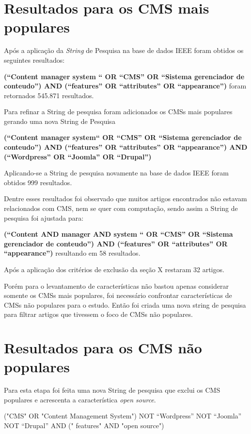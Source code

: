 \begin{apendicesenv}
\section{Resultados para os CMS mais populares}
 
Após a aplicação da \textit{String} de Pesquisa na base de dados IEEE foram obtidos os seguintes resultados:

\textbf{(“Content manager system “ OR “CMS” OR “Sistema gerenciador de conteudo”) AND (“features” OR “attributes” OR “appearance”)} foram retornados 545.871 resultados.

Para refinar a String de pesquisa foram adicionados os CMSs mais populares gerando uma nova String de Pesquisa

\textbf{(“Content manager system“ OR “CMS” OR “Sistema gerenciador de conteudo”) AND (“features” OR “attributes” OR “appearance”) AND (“Wordpress”  OR  “Joomla” OR “Drupal”)}

Aplicando-se a String de pesquisa novamente na base de dados IEEE foram obtidos 999 resultados.

Dentre esses resultados foi observado que muitos artigos encontrados não estavam relacionados com CMS, nem se quer com computação, sendo assim a String de pesquisa foi ajustada para:

\textbf{(“Content AND manager AND system “ OR “CMS” OR “Sistema gerenciador de conteudo”) AND (“features” OR “attributes” OR “appearance”)} resultando em 58 resultados.



Após a aplicação dos critérios de exclusão da seção X restaram 32 artigos.
		
Porém para o levantamento de características não bastou apenas considerar somente os CMSs mais populares, foi necessário confrontar características de CMSs não populares para o estudo. Então foi criada uma nova string de pesquisa para filtrar artigos que tivessem o foco de CMSs não populares.

 \section{Resultados para os CMS não populares}
 \label{resultados_nao_populares}

Para esta etapa foi feita uma nova String de pesquisa que exclui os CMS populares e acrescenta a característica \textit{open source}. 

("CMS" OR "Content Management System") NOT “Wordpress”   NOT   “Joomla”  NOT “Drupal” AND (" features"  AND "open source")


\end{apendicesenv}
